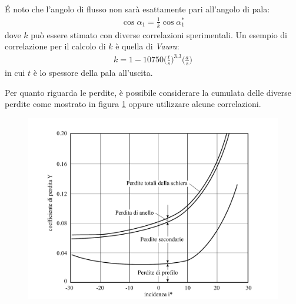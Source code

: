 \'E noto che l'angolo di flusso non sarà esattamente pari all'angolo di pala:
\begin{align*}
\cos \alpha_1 = \frac{1}{k} \cos \alpha_1^*
\end{align*}
dove $k$ può essere stimato con diverse correlazioni sperimentali. Un esempio di correlazione per il calcolo di $k$ è quella di \textit{Vaura}:
\begin{align*}
k = 1 - 10750 \bigg( \frac{t}{s} \bigg)^{3.3} \bigg( \frac{a}{s} \bigg)
\end{align*}
in cui $t$ è lo spessore della pala all'uscita.

Per quanto riguarda le perdite, è possibile considerare la cumulata delle diverse perdite come mostrato in figura \ref{fig:PerditeSchiera} oppure utilizzare alcune correlazioni. 
\begin{figure}
\centering
  \includegraphics[width=.65\textwidth]{fig/PerditeSchiera.pdf}
\caption{}
\label{fig:PerditeSchiera}
\end{figure}
